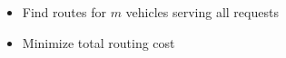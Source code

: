 \documentclass[aspectratio=1610]{beamer}
\newcommand{\important}[1]{{\color{green!60!black}#1}}
\let\oldfootnotesize\footnotesize
\renewcommand*{\footnotesize}{\oldfootnotesize\fontsize{6}{4}\selectfont}
\renewcommand{\footnotesize}{\scriptsize}
\begin{document}
\begin{frame}
\medskip
{}
\begin{itemize}
	\item Find \important{routes} for $m$ vehicles serving all requests
	\item Minimize \important{total routing cost}
\end{itemize}
	
\end{frame}


	
	
\end{document}
